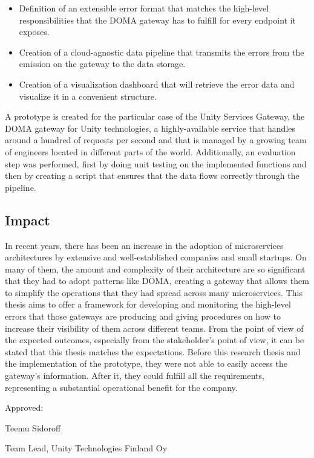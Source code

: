 \documentclass[12pt]{article}
\begin{document}
\begin{itemize}
    \item Definition of an extensible error format that matches the high-level responsibilities that the DOMA gateway has to fulfill for every endpoint it exposes.
    \item Creation of a cloud-agnostic data pipeline that transmits the errors from the emission on the gateway to the data storage.
    \item Creation of a visualization dashboard that will retrieve the error data and visualize it in a convenient structure.
\end{itemize}

A prototype is created for the particular case of the Unity Services Gateway, the DOMA gateway for Unity technologies, a highly-available service that handles around a hundred of requests per second and that is managed by a growing team of engineers located in different parts of the world. Additionally, an evaluation step was performed, first by doing unit testing on the implemented functions and then by creating a script that ensures that the data flows correctly through the pipeline.

\subsection{Impact}

In recent years, there has been an increase in the adoption of microservices architectures by extensive and well-established companies and small startups. On many of them, the amount and complexity of their architecture are so significant that they had to adopt patterns like DOMA, creating a gateway that allows them to simplify the operations that they had spread across many microservices. This thesis aims to offer a framework for developing and monitoring the high-level errors that those gateways are producing and giving procedures on how to increase their visibility of them across different teams. From the point of view of the expected outcomes, especially from the stakeholder's point of view, it can be stated that this thesis matches the expectations. Before this research thesis and the implementation of the prototype, they were not able to easily access the gateway's information. After it, they could fulfill all the requirements, representing a substantial operational benefit for the company.

\vspace{15cm}

Approved: \hrulefill

\hspace*{0mm}\phantom{Approved: }Teemu Sidoroff

\hspace*{0mm}\phantom{Approved: }Team Lead, Unity Technologies Finland Oy
\end{document}
